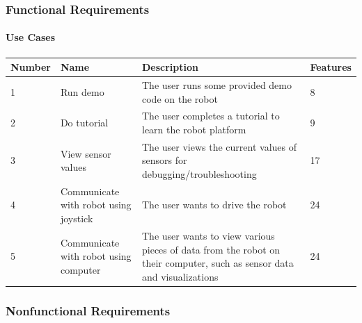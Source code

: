 \documentclass{fank1basedocument}
\begin{document}
\subsubsection*{Functional Requirements}

\paragraph{Use Cases}
\begin{center}
	\begin{tabular}{|p{}|>{\raggedright\arraybackslash}p{}|p{}|p{}|}
		\hline
		\textbf{Number} & \textbf{Name} & \textbf{Description} & \textbf{Features}\\
		\hline
		1 & Run demo & The user runs some provided demo code on the robot  & 8\\
		\hline
		2 & Do tutorial & The user completes a tutorial to learn the robot platform & 9\\
		\hline
		3 & View sensor values & The user views the current values of sensors for debugging/troubleshooting & 17\\
		\hline
		4 & Communicate with robot using joystick & The user wants to drive the robot & 24\\
		\hline
		5 & Communicate with robot using computer & The user wants to view various pieces of data from the robot on their computer, such as sensor data and visualizations & 24\\
		\hline
	\end{tabular}
\end{center}

\pagebreak

\subsubsection*{Nonfunctional Requirements}
\end{document}
